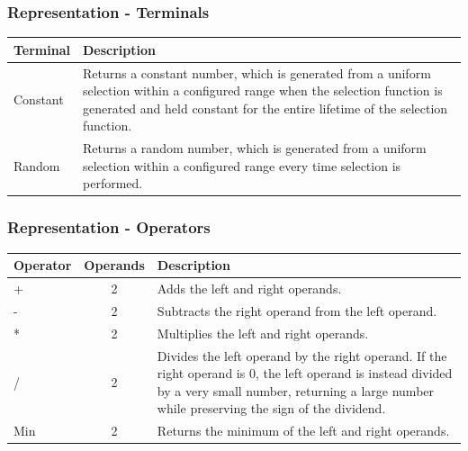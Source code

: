 \documentclass{beamer}
\begin{document}
	\begin{frame}
		\frametitle{Representation - Terminals}
		
		\begin{table}
		\centering
		  \label{tab:gp-terminals3}
		  \begin{tabular}{p{3cm}|p{7cm}}
		  \hline
		    \textbf{Terminal} & \textbf{Description}\\
		    \hline
			    Constant &  Returns a constant number, which is generated from a uniform selection within a configured range when the selection function is generated and held constant for the entire lifetime of the selection function. \\
			    \hline
			    Random &  Returns a random number, which is generated from a uniform selection within a configured range every time selection is performed. \\     
			    \hline      
		    
		\end{tabular}
		\end{table}		
	\end{frame}			
	
	
	\begin{frame}
		\frametitle{Representation - Operators}
		
		\begin{table}
		\centering
		  \label{tab:gp-operators1}
		  \begin{tabular}{p{1.5cm}|c|p{6cm}}
			  \hline
			    \textbf{Operator} & \textbf{Operands} & \textbf{Description}\\
			    \hline
			    + & 2 & Adds the left and right operands. \\
			    \hline
			    - & 2 & Subtracts the right operand from the left operand.\\    
			    \hline
			    * & 2 & Multiplies the left and right operands.\\  
			    \hline
			    / & 2 & Divides the left operand by the right operand. If the right operand is 0, the left operand is instead divided by a very small number, returning a large number while preserving the sign of the dividend.\\      
			    \hline
			    Min & 2 & Returns the minimum of the left and right operands.\\
			    \hline				       
		    
		\end{tabular}
		\end{table}		
	\end{frame}
	
\end{document}
